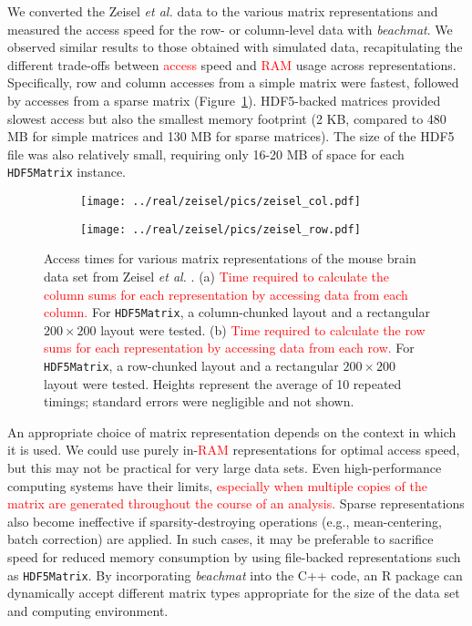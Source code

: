 \documentclass[10pt,letterpaper]{article}
\newcommand{\beachmat}{\textit{beachmat}}
\newcommand{\code}[1]{\texttt{#1}}
\newcommand{\revised}[1]{\textcolor{red}{#1}}
\begin{document}
We converted the Zeisel \textit{et al.} data to the various matrix representations and measured the access speed for the row- or column-level data with \beachmat{}.
We observed similar results to those obtained with simulated data, recapitulating the different trade-offs between \revised{access} speed and \revised{RAM} usage across representations.
Specifically, row and column accesses from a simple matrix were fastest, followed by accesses from a sparse matrix (Figure~\ref{fig:zeisel}).
HDF5-backed matrices provided slowest access but also the smallest memory footprint (2 KB, compared to 480 MB for simple matrices and 130 MB for sparse matrices).
The size of the HDF5 file was also relatively small, requiring only 16-20 MB of space for each \code{HDF5Matrix} instance.

\begin{figure}[bt]
    \begin{subfigure}[b]{0.49\textwidth}
        \texttt{[image: ../real/zeisel/pics/zeisel\_col.pdf]}
        \caption{}
    \end{subfigure}
    \begin{subfigure}[b]{0.49\textwidth}
        \texttt{[image: ../real/zeisel/pics/zeisel\_row.pdf]}
        \caption{}
    \end{subfigure}
    \caption{Access times for various matrix representations of the mouse brain data set from Zeisel \textit{et al.} \cite{zeisel2015brain}.
        (a) \revised{Time required to calculate the column sums for each representation by accessing data from each column.}
        For \code{HDF5Matrix}, a column-chunked layout and a rectangular $200 \times 200$ layout were tested.
        (b) \revised{Time required to calculate the row sums for each representation by accessing data from each row.}
        For \code{HDF5Matrix}, a row-chunked layout and a rectangular $200 \times 200$ layout were tested.
        Heights represent the average of 10 repeated timings; standard errors were negligible and not shown.
    }
    \label{fig:zeisel}
\end{figure}

An appropriate choice of matrix representation depends on the context in which it is used.
We could use purely in-\revised{RAM} representations for optimal access speed, but this may not be practical for very large data sets.
Even high-performance computing systems have their limits, \revised{especially when multiple copies of the matrix are generated throughout the course of an analysis.}
Sparse representations also become ineffective if sparsity-destroying operations (e.g., mean-centering, batch correction) are applied.
In such cases, it may be preferable to sacrifice speed for reduced memory consumption by using file-backed representations such as \code{HDF5Matrix}.
By incorporating \beachmat{} into the C++ code, an R package can dynamically accept different matrix types appropriate for the size of the data set and computing environment.
\end{document}
